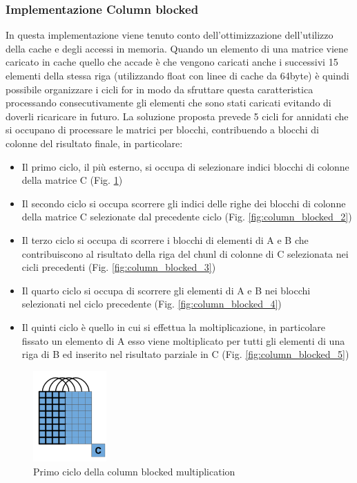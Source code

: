 \documentclass[conference]{IEEEtran}
\begin{document}
\subsubsection{Implementazione Column blocked}
In questa implementazione viene tenuto conto dell'ottimizzazione dell'utilizzo della cache e degli accessi in memoria. Quando un elemento di una matrice viene caricato in cache quello che accade è che vengono caricati anche i successivi 15 elementi della stessa riga (utilizzando float con linee di cache da 64byte) è quindi possibile organizzare i cicli for in modo da sfruttare questa caratteristica processando consecutivamente gli elementi che sono stati caricati evitando di doverli ricaricare in futuro.
La soluzione proposta prevede 5 cicli for annidati che si occupano di processare le matrici per blocchi, contribuendo a blocchi di colonne del risultato finale, in particolare:
\begin{itemize}
    \item Il primo ciclo, il più esterno, si occupa di selezionare indici blocchi di colonne della matrice C (Fig. \ref{fig:column_blocked_1})
    \item Il secondo ciclo si occupa scorrere gli indici delle righe dei blocchi di colonne della matrice C selezionate dal precedente ciclo (Fig. \ref{fig:column_blocked_2})
    \item Il terzo ciclo si occupa di scorrere i blocchi di elementi di A e B che contribuiscono al risultato della riga del chunl di colonne di C selezionata nei cicli precedenti (Fig. \ref{fig:column_blocked_3})
    \item Il quarto ciclo si occupa di scorrere gli elementi di A e B nei blocchi selezionati nel ciclo precedente (Fig. \ref{fig:column_blocked_4})
    \item Il quinti ciclo è quello in cui si effettua la moltiplicazione, in particolare fissato un elemento di A esso viene moltiplicato per tutti gli elementi di una riga di B ed inserito nel risultato parziale in C (Fig. \ref{fig:column_blocked_5})
\end{itemize}
\begin{figure}
    \centering
    \includegraphics[width=0.25\textwidth]{resources/column_blocked_1.png}
    \caption{Primo ciclo della column blocked multiplication}
    \label{fig:column_blocked_1}
\end{figure}
\end{document}
